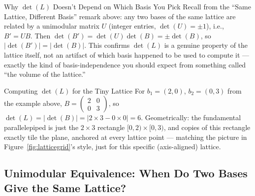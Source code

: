 \begin{rmkbox}{Why $\det(L)$ Doesn't Depend on Which Basis You Pick}
Recall from the ``Same Lattice, Different Basis'' remark above: any two bases of the same lattice are related by a unimodular matrix $U$ (integer entries, $\det(U) = \pm 1$), i.e., $B' = UB$. Then $\det(B') = \det(U)\det(B) = \pm \det(B)$, so $|\det(B')| = |\det(B)|$. This confirms $\det(L)$ is a genuine property of the lattice itself, not an artifact of which basis happened to be used to compute it --- exactly the kind of basis-independence you should expect from something called ``the volume of the lattice.''
\end{rmkbox}

\begin{exbox}{Computing $\det(L)$ for the Tiny Lattice}
For $b_1=(2,0)$, $b_2=(0,3)$ from the example above, $B = \begin{pmatrix} 2 & 0 \\ 0 & 3 \end{pmatrix}$, so $\det(L) = |\det(B)| = |2 \times 3 - 0 \times 0| = 6$. Geometrically: the fundamental parallelepiped is just the $2\times 3$ rectangle $[0,2)\times[0,3)$, and copies of this rectangle exactly tile the plane, anchored at every lattice point --- matching the picture in Figure~\ref{fig:latticegrid}'s style, just for this specific (axis-aligned) lattice.
\end{exbox}

\subsection{Unimodular Equivalence: When Do Two Bases Give the Same Lattice?}
\label{sec:L1:unimodular-equivalence-when-do-two-bases}

